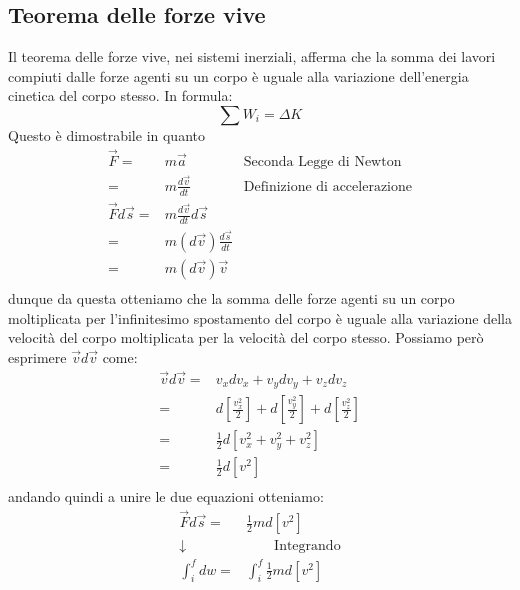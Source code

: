         \subsection{Teorema delle forze vive}
            Il teorema delle forze vive, nei sistemi inerziali, afferma che la somma dei lavori compiuti dalle forze agenti su un corpo è uguale alla variazione dell'energia cinetica del corpo stesso. In formula:
            \begin{equation}
                \sum W_{i} = \Delta K
            \end{equation}
            Questo è dimostrabile in quanto
            $$
                \begin{aligned}
                    \vec{F} =& m\vec{a} \qquad & \text{Seconda Legge di Newton}\\
                    =& m\frac{d\vec{v}}{dt} \qquad & \text{Definizione di accelerazione}\\
                    \vec{F}d\vec{s} =& m\frac{d\vec{v}}{dt}d\vec{s}\\
                    =& m(d\vec{v})\frac{d\vec{s}}{dt}\\
                    =& m(d\vec{v})\vec{v}\\
                \end{aligned}
            $$
            dunque da questa otteniamo che la somma delle forze agenti su un corpo moltiplicata per l'infinitesimo spostamento del corpo è uguale alla variazione della velocità del corpo moltiplicata per la velocità del corpo stesso. Possiamo però esprimere $\vec{v}d\vec{v}$ come:
            $$
                \begin{aligned}
                    \vec{v}d\vec{v} =& v_xdv_x + v_ydv_y + v_zdv_z\\
                    =&d\left[\frac{v_x^2}2\right] + d\left[\frac{v_y^2}2\right] + d\left[\frac{v_z^2}2\right]\\
                    =& \frac12d\left[v_x^2 + v_y^2 + v_z^2\right]\\
                    =& \frac12d\left[v^2\right]\\
                \end{aligned}
            $$
            andando quindi a unire le due equazioni otteniamo:
            $$
                \begin{aligned}
                    \vec{F}d\vec{s} =& \frac12m d\left[v^2\right]\\
                    \downarrow & \qquad \text{Integrando}\\
                    \int_i^f dw =& \int_i^f \frac12m d\left[v^2\right]
                \end{aligned}
            $$
